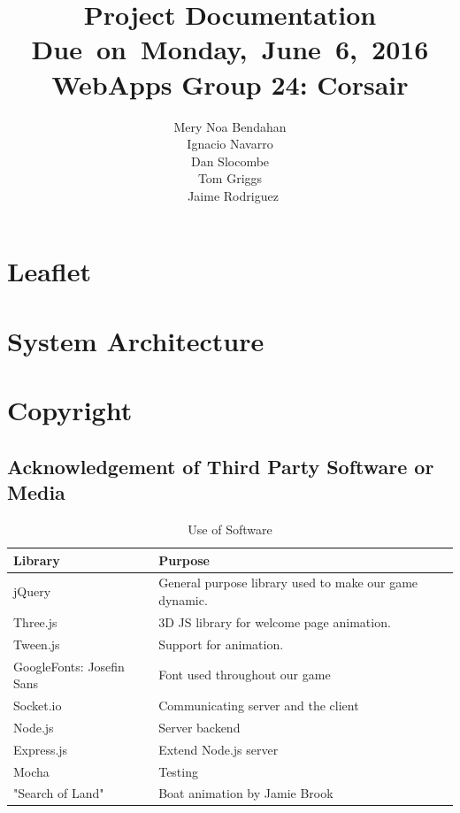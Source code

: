 \documentclass{article}
\title{
\vspace{2in}
\textmd{\textbf{Project Documentation}}\\
\normalsize\vspace{0.1in}\small{Due\ on\ Monday,\ June\ 6,\ 2016}\\
\vspace{0.1in}\large{\textbf{WebApps Group 24: Corsair}}
\vspace{3in}
}
\author{Mery Noa Bendahan \\ Ignacio Navarro \\ Dan Slocombe \\ Tom Griggs \\ Jaime Rodriguez}
\date{}
\renewcommand{\_}{\char`_}
\begin{document}
\maketitle
\newpage


\section{Leaflet}

\section{System Architecture}

\section{Copyright}

\subsection{Acknowledgement of Third Party Software or Media}

\begin{table}[H]
\centering
\caption{Use of Software}
\label{my-label}
\begin{tabular}{|l|l|}
\hline
\textbf{Library}         & \textbf{Purpose}                                        \\ \hline
jQuery                    & General purpose library used to make our game dynamic. \\ \hline
Three.js                  & 3D JS library for welcome page animation.              \\ \hline
Tween.js                  & Support for animation.                                 \\ \hline
GoogleFonts: Josefin Sans & Font used throughout our game                          \\ \hline
Socket.io                 & Communicating server and the client                    \\ \hline
Node.js                   & Server backend                                         \\ \hline
Express.js                & Extend Node.js server                                  \\ \hline
Mocha                     & Testing                                                \\ \hline
"Search of Land"          & Boat animation by Jamie Brook                               \\ \hline
\end{tabular}
\end{table}
\end{document}
